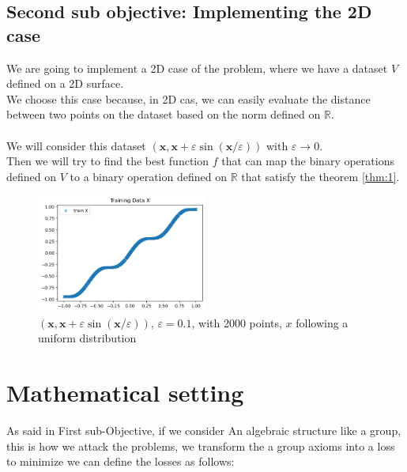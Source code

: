 \documentclass{report}
\begin{document}
        \subsection*{Second sub objective: Implementing the 2D case}
            We are going to implement a 2D case of the problem, where we have a dataset $V$ defined on a 2D surface.
            \\ 
            We choose this case because, in 2D cas, we can easily evaluate the distance between two points on the dataset based on the norm defined on $\mathbb{R}$.
            \\
            \\
            We will consider this dataset 
            $(\mathbf{x}, \mathbf{x}+\varepsilon \sin (\mathbf{x} / \varepsilon))$ with $\varepsilon \rightarrow 0$.
            \\
            Then we will try to find the best function $f$ that can map the binary operations defined on $V$ to a binary operation defined on $\mathbb{R}$ that satisfy the theorem \ref{thm:1}.
            \newpage
            \begin{figure}
                \centering
                \includegraphics[width=0.5\textwidth]{./images/M.png}
                \caption{$(\mathbf{x}, \mathbf{x}+\varepsilon \sin (\mathbf{x} / \varepsilon))$,  $\varepsilon = 0.1$, with 2000 points, $x$ following a uniform distribution}
            \end{figure}
        
\section{Mathematical setting}

    As said in  First sub-Objective, if we consider An algebraic structure like a group, this is how  we attack the problems, we transform the a group axioms into a loss to minimize we can define the losses as follows: 
\end{document}
